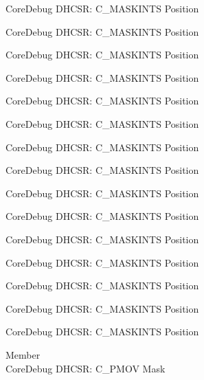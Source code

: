 \begin{DoxyRefList}
\label{deprecated__deprecated000121}%
%
Core\+Debug DHCSR\+: C\+\_\+\+MASKINTS Position 

\label{deprecated__deprecated000177}%
%
Core\+Debug DHCSR\+: C\+\_\+\+MASKINTS Position 

\label{deprecated__deprecated000260}%
%
Core\+Debug DHCSR\+: C\+\_\+\+MASKINTS Position 

\label{deprecated__deprecated000319}%
%
Core\+Debug DHCSR\+: C\+\_\+\+MASKINTS Position 

\label{deprecated__deprecated000395}%
%
Core\+Debug DHCSR\+: C\+\_\+\+MASKINTS Position 

\label{deprecated__deprecated000484}%
%
Core\+Debug DHCSR\+: C\+\_\+\+MASKINTS Position 

\label{deprecated__deprecated000586}%
%
Core\+Debug DHCSR\+: C\+\_\+\+MASKINTS Position 

\label{deprecated__deprecated000692}%
%
Core\+Debug DHCSR\+: C\+\_\+\+MASKINTS Position 

\label{deprecated__deprecated000780}%
%
Core\+Debug DHCSR\+: C\+\_\+\+MASKINTS Position 

\label{deprecated__deprecated000836}%
%
Core\+Debug DHCSR\+: C\+\_\+\+MASKINTS Position 

\label{deprecated__deprecated000919}%
%
Core\+Debug DHCSR\+: C\+\_\+\+MASKINTS Position 

\label{deprecated__deprecated000978}%
%
Core\+Debug DHCSR\+: C\+\_\+\+MASKINTS Position 

\label{deprecated__deprecated001054}%
%
Core\+Debug DHCSR\+: C\+\_\+\+MASKINTS Position 

\label{deprecated__deprecated001143}%
%
Core\+Debug DHCSR\+: C\+\_\+\+MASKINTS Position 

\label{deprecated__deprecated001245}%
%
Core\+Debug DHCSR\+: C\+\_\+\+MASKINTS Position  
\item[Member \doxylink{group___c_m_s_i_s___s_c_b_ga6c41fddb98d97a17f3e9020278a1aed1}{Core\+Debug\+\_\+\+DHCSR\+\_\+\+C\+\_\+\+PMOV\+\_\+\+Msk} ]\hfill \\
\label{deprecated__deprecated000030}%
%
Core\+Debug DHCSR\+: C\+\_\+\+PMOV Mask 


\end{DoxyRefList}

